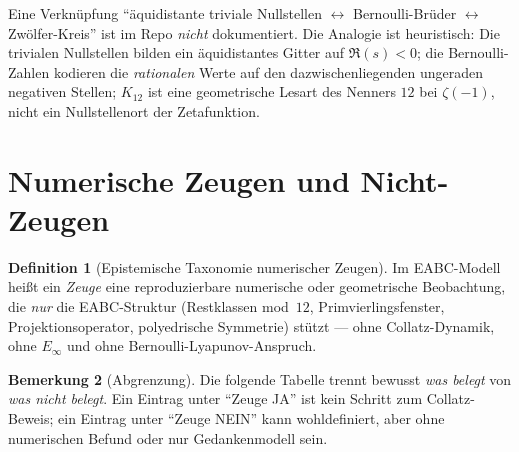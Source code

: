 \documentclass[11pt,a4paper]{article}
\theoremstyle{definition}
\newtheorem{definition}{Definition}[section]
\newtheorem{bemerkung}[definition]{Bemerkung}
\theoremstyle{remark}
\newcommand{\Einf}{E_{\infty}}
\begin{document}
\noindent
Eine Verknüpfung ``äquidistante triviale Nullstellen $\leftrightarrow$
Bernoulli-Brüder $\leftrightarrow$ Zwölfer-Kreis'' ist im Repo
\emph{nicht} dokumentiert. Die Analogie ist heuristisch: Die trivialen
Nullstellen bilden ein äquidistantes Gitter auf $\Re(s)<0$; die
Bernoulli-Zahlen kodieren die \emph{rationalen} Werte auf den
dazwischenliegenden ungeraden negativen Stellen; $K_{12}$ ist eine
geometrische Lesart des Nenners $12$ bei $\zeta(-1)$, nicht ein
Nullstellenort der Zetafunktion.

\section{Numerische Zeugen und Nicht-Zeugen}
\label{sec:numerische-zeugen}

\begin{definition}[Epistemische Taxonomie numerischer Zeugen]
Im EABC-Modell heißt ein \emph{Zeuge} eine reproduzierbare numerische
oder geometrische Beobachtung, die \emph{nur} die EABC-Struktur
(Restklassen mod~$12$, Primvierlingsfenster, Projektionsoperator,
polyedrische Symmetrie) stützt --- ohne Collatz-Dynamik,
ohne $\Einf$ und ohne Bernoulli-Lyapunov-Anspruch.
\end{definition}

\begin{bemerkung}[Abgrenzung]
Die folgende Tabelle trennt bewusst \emph{was belegt} von
\emph{was nicht belegt}. Ein Eintrag unter ``Zeuge JA'' ist kein
Schritt zum Collatz-Beweis; ein Eintrag unter ``Zeuge NEIN'' kann
wohldefiniert, aber ohne numerischen Befund oder nur Gedankenmodell sein.
\end{bemerkung}
\end{document}
